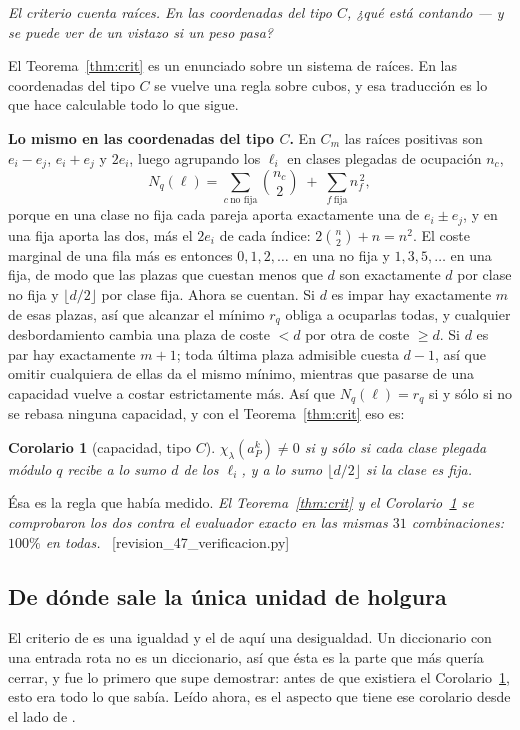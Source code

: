 \documentclass[11pt,a4paper]{article}
\newtheorem{corollary}[theorem]{Corolario}
\newcommand{\ver}[1]{\unskip\penalty0\ \textcolor{azul}{\small\textsf{[#1]}}}
\begin{document}
\noindent\emph{El criterio cuenta raíces. En las coordenadas del tipo $C$, ¿qué está contando --- y se puede ver de un vistazo si un peso pasa?}

El Teorema~\ref{thm:crit} es un enunciado sobre un sistema de raíces. En las coordenadas del tipo
$C$ se vuelve una regla sobre cubos, y esa traducción es lo que hace calculable todo lo que sigue.


\noindent\textbf{Lo mismo en las coordenadas del tipo $C$.} En $C_m$ las raíces positivas son $e_i-e_j$,
$e_i+e_j$ y $2e_i$, luego agrupando los $\ell_i$ en clases plegadas de ocupación $n_c$,
\[
N_q(\ell)=\sum_{c\ \text{no fija}}\binom{n_c}{2}\;+\;\sum_{f\ \text{fija}}n_f^{\,2},
\]
porque en una clase no fija cada pareja aporta exactamente una de $e_i\pm e_j$, y en una fija aporta
las dos, más el $2e_i$ de cada índice: $2\binom n2+n=n^2$. El coste marginal de una fila más es
entonces $0,1,2,\dots$ en una no fija y $1,3,5,\dots$ en una fija, de modo que las plazas que cuestan
menos que $d$ son exactamente $d$ por clase no fija y $\lfloor d/2\rfloor$ por clase fija. Ahora se
cuentan. Si $d$ es impar hay exactamente $m$ de esas plazas, así que alcanzar el mínimo $r_q$ obliga
a ocuparlas todas, y cualquier desbordamiento cambia una plaza de coste $<d$ por otra de coste
$\ge d$. Si $d$ es par hay exactamente $m+1$; toda última plaza admisible cuesta $d-1$, así que
omitir cualquiera de ellas da el mismo mínimo, mientras que pasarse de una capacidad vuelve a costar
estrictamente más. Así que $N_q(\ell)=r_q$ si y sólo si no se rebasa ninguna capacidad, y con el
Teorema~\ref{thm:crit} eso es:

\begin{corollary}[capacidad, tipo $C$]\label{conj:cap}
$\chi_\lambda(a_P^k)\neq0$ si y sólo si cada clase plegada módulo $q$ recibe a lo sumo $d$ de los
$\ell_i$, y a lo sumo $\lfloor d/2\rfloor$ si la clase es fija.
\end{corollary}

\noindent Ésa es la regla que había medido.
\emph{El Teorema~\ref{thm:crit} y el Corolario~\ref{conj:cap} se comprobaron los dos contra el
evaluador exacto en las mismas $31$ combinaciones: $100\%$ en todas.}
\ver{revision\_47\_verificacion.py}

\subsection*{De dónde sale la única unidad de holgura}

El criterio de \cite{Prasad16b} es una igualdad y el de aquí una desigualdad. Un diccionario con una
entrada rota no es un diccionario, así que ésta es la parte que más quería cerrar, y fue lo primero
que supe demostrar: antes de que existiera el Corolario~\ref{conj:cap}, esto era todo lo que sabía.
Leído ahora, es el aspecto que tiene ese corolario desde el lado de \cite{Prasad16b}.
\end{document}
